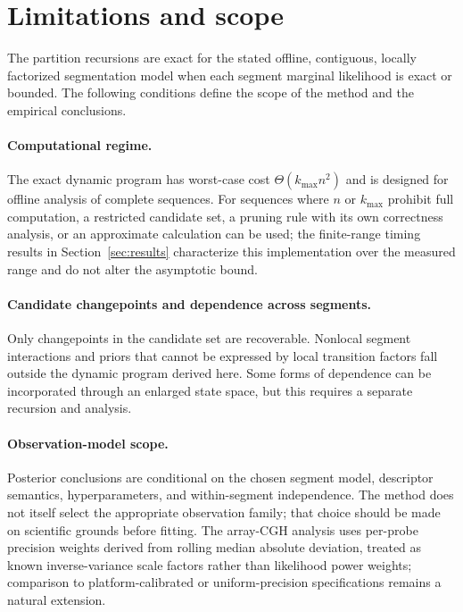 \section{Limitations and scope}
\label{sec:limitations}

The partition recursions are exact for the stated offline, contiguous, locally factorized segmentation model when each segment marginal likelihood is exact or bounded. The following conditions define the scope of the method and the empirical conclusions.

\paragraph{Computational regime.}
The exact dynamic program has worst-case cost $\Theta(k_{\max}n^2)$ and is designed for offline analysis of complete sequences. For sequences where $n$ or $k_{\max}$ prohibit full computation, a restricted candidate set, a pruning rule with its own correctness analysis, or an approximate calculation can be used; the finite-range timing results in Section~\ref{sec:results} characterize this implementation over the measured range and do not alter the asymptotic bound.

\paragraph{Candidate changepoints and dependence across segments.}
Only changepoints in the candidate set are recoverable. Nonlocal segment interactions and priors that cannot be expressed by local transition factors fall outside the dynamic program derived here. Some forms of dependence can be incorporated through an enlarged state space, but this requires a separate recursion and analysis.

\paragraph{Observation-model scope.}
Posterior conclusions are conditional on the chosen segment model, descriptor semantics, hyperparameters, and within-segment independence. The method does not itself select the appropriate observation family; that choice should be made on scientific grounds before fitting. The array-CGH analysis uses per-probe precision weights derived from rolling median absolute deviation, treated as known inverse-variance scale factors rather than likelihood power weights; comparison to platform-calibrated or uniform-precision specifications remains a natural extension.

